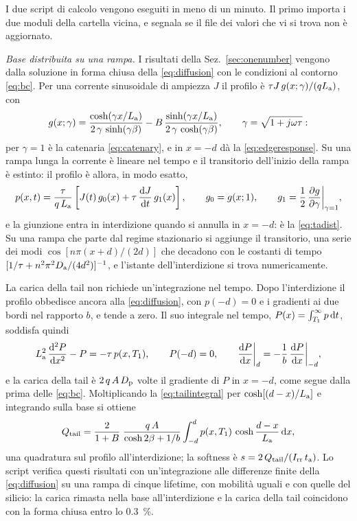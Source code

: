 \documentclass[10pt,a4paper]{scrartcl}
\let\newcommand\pdvaluedefine
\newcommand{\Irr}{I_\mathrm{rr}}
\newcommand{\ta}{t_\mathrm{a}}
\newcommand{\Tone}{T_1}
\newcommand{\diff}{\mathrm{d}}
\newcommand{\Da}{D_\mathrm{a}}
\newcommand{\La}{L_\mathrm{a}}
\newcommand{\Dp}{D_\mathrm{p}}
\newcommand{\dpar}[2]{\frac{\partial #1}{\partial #2}}
\begin{document}
I due script di calcolo vengono eseguiti in meno di un minuto. Il primo importa i due moduli della cartella vicina, e segnala se il file dei valori che vi si trova non è aggiornato.

\emph{Base distribuita su una rampa.} I risultati della Sez.~\ref{sec:onenumber} vengono dalla soluzione in forma chiusa della \eqref{eq:diffusion} con le condizioni al contorno \eqref{eq:bc}. Per una corrente sinusoidale di ampiezza $J$ il profilo è $\tau J\,g(x;\gamma)/(q\La)$, con
\begin{equation}
g(x;\gamma) = \frac{\cosh(\gamma x/\La)}{2\,\gamma\,\sinh(\gamma\beta)} - B\,\frac{\sinh(\gamma x/\La)}{2\,\gamma\,\cosh(\gamma\beta)} , \qquad \gamma = \sqrt{1+j\omega\tau} :
\label{eq:gprofile}
\end{equation}
per $\gamma = 1$ è la catenaria \eqref{eq:catenary}, e in $x = -d$ dà la \eqref{eq:edgeresponse}. Su una rampa lunga la corrente è lineare nel tempo e il transitorio dell'inizio della rampa è estinto: il profilo è allora, in modo esatto,
\begin{equation}
p(x,t) = \frac{\tau}{q\,\La}\left[J(t)\,g_0(x) + \tau\,\frac{\diff J}{\diff t}\,g_1(x)\right] , \qquad g_0 = g(x;1) , \qquad g_1 = \frac12\,\dpar{g}{\gamma}\bigg|_{\gamma=1} ,
\label{eq:rampprofile}
\end{equation}
e la giunzione entra in interdizione quando si annulla in $x = -d$: è la \eqref{eq:tadist}. Su una rampa che parte dal regime stazionario si aggiunge il transitorio, una serie dei modi $\cos[n\pi(x+d)/(2d)]$ che decadono con le costanti di tempo $[1/\tau + n^2\pi^2\Da/(4d^2)]^{-1}$, e l'istante dell'interdizione si trova numericamente.

La carica della tail non richiede un'integrazione nel tempo. Dopo l'interdizione il profilo obbedisce ancora alla \eqref{eq:diffusion}, con $p(-d) = 0$ e i gradienti ai due bordi nel rapporto $b$, e tende a zero. Il suo integrale nel tempo, $P(x) = \int_{\Tone}^{\infty} p\,\diff t$, soddisfa quindi
\begin{equation}
\La^2\,\frac{\diff^2 P}{\diff x^2} - P = -\tau\,p(x,\Tone) , \qquad P(-d) = 0 , \qquad \frac{\diff P}{\diff x}\bigg|_{d} = -\frac1b\,\frac{\diff P}{\diff x}\bigg|_{-d} ,
\label{eq:tailintegral}
\end{equation}
e la carica della tail è $2\,q\,A\,\Dp$ volte il gradiente di $P$ in $x = -d$, come segue dalla prima delle \eqref{eq:bc}. Moltiplicando la \eqref{eq:tailintegral} per $\cosh[(d-x)/\La]$ e integrando sulla base si ottiene
\begin{equation}
Q_\mathrm{tail} = \frac{2}{1+B}\;\frac{q\,A}{\cosh 2\beta + 1/b}\int_{-d}^{d} p(x,\Tone)\,\cosh\frac{d-x}{\La}\,\diff x ,
\label{eq:qtail}
\end{equation}
una quadratura sul profilo all'interdizione; la softness è $s = 2\,Q_\mathrm{tail}/(\Irr\,\ta)$. Lo script verifica questi risultati con un'integrazione alle differenze finite della \eqref{eq:diffusion} su una rampa di cinque lifetime, con mobilità uguali e con quelle del silicio: la carica rimasta nella base all'interdizione e la carica della tail coincidono con la forma chiusa entro lo \SI{0.3}{\percent}.
\end{document}

